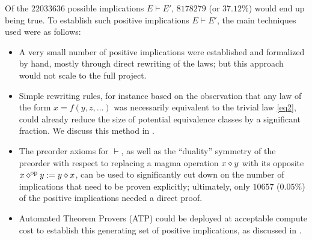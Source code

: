 Of the $22033636$ possible implications $E \vdash E'$, $8178279$ (or $37.12\%$) would end up being true. To establish such positive implications $E \vdash E'$, the main techniques used were as follows:

\begin{itemize}
    \item A very small number of positive implications were established and formalized by hand, mostly through direct rewriting of the laws; but this approach would not scale to the full project.
    \item Simple rewriting rules, for instance based on the observation that any law of the form $x = f(y,z,\dots)$ was necessarily equivalent to the trivial law \eqref{eq2}, could already reduce the size of potential equivalence classes by a significant fraction. We discuss this method in .
    \item The preorder axioms for $\vdash$, as well as the ``duality'' symmetry of the preorder with respect to replacing a magma operation $x \diamond y$ with its opposite $x \diamond^{\mathrm{op}} y := y \diamond x$, can be used to significantly cut down on the number of implications that need to be proven explicitly; ultimately, only $10657$ ($0.05\%$) of the positive implications needed a direct proof.
    \item Automated Theorem Provers (ATP) could be deployed at acceptable compute cost to establish this generating set of positive implications, as discussed in .
\end{itemize}

